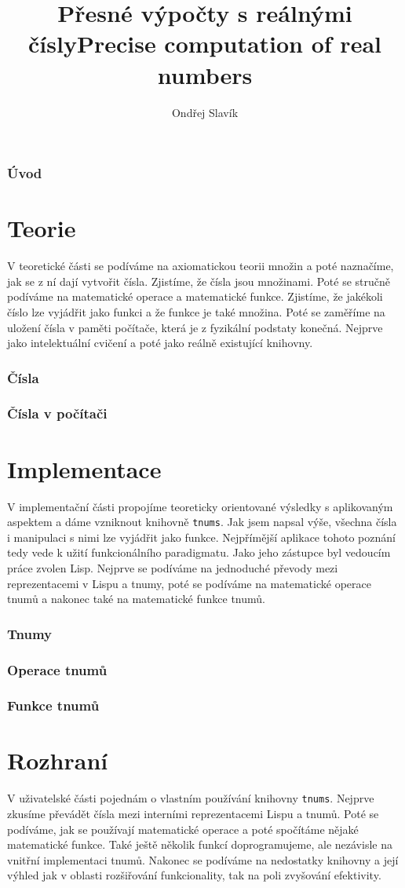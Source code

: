 \documentclass[
master=false,
field=inf,
encoding=utf8,
language=czech,
printversion=false,]{kidiplom}
\title{Přesné výpočty s reálnými čísly}
\title[english]{Precise computation of real numbers}
\author{Ondřej Slavík}
\newcommand{\mypart}{\newpage\part}
\begin{document}
\setcounter{tocdepth}{3}
\maketitle
\section{Úvod}

\mypart{Teorie}
V teoretické části se podíváme na axiomatickou teorii množin a poté naznačíme, jak se z ní dají vytvořit čísla. Zjistíme, že čísla jsou množinami. Poté se stručně podíváme na matematické operace a matematické funkce. Zjistíme, že jakékoli číslo lze vyjádřit jako funkci a že funkce je také množina. Poté se zaměříme na uložení čísla v paměti počítače, která je z fyzikální podstaty konečná. Nejprve jako intelektuální cvičení a poté jako reálně existující knihovny.
\section{Čísla}
	
\clearpage
\section{Čísla v počítači}

\mypart{Implementace}
V implementační části propojíme teoreticky orientované výsledky s aplikovaným aspektem a dáme vzniknout knihovně \texttt{tnums}. Jak jsem napsal výše, všechna čísla i manipulaci s nimi lze vyjádřit jako funkce. Nejpřímější aplikace tohoto poznání tedy vede k užití funkcionálního paradigmatu. Jako jeho zástupce byl vedoucím práce zvolen Lisp. Nejprve se podíváme na jednoduché převody mezi reprezentacemi v Lispu a tnumy, poté se podíváme na matematické operace tnumů a nakonec také na matematické funkce tnumů.
\section{Tnumy}

\clearpage
\section{Operace tnumů}

\clearpage
\section{Funkce tnumů}

\mypart{Rozhraní}
V uživatelské části pojednám o vlastním používání knihovny \texttt{tnums}. Nejprve zkusíme převádět čísla mezi interními reprezentacemi Lispu a tnumů. Poté se podíváme, jak se používají matematické operace a poté spočítáme nějaké matematické funkce. Také ještě několik funkcí doprogramujeme, ale nezávisle na vnitřní implementaci tnumů. Nakonec se podíváme na nedostatky knihovny a její výhled jak v oblasti rozšiřování funkcionality, tak na poli zvyšování efektivity.
\end{document}

